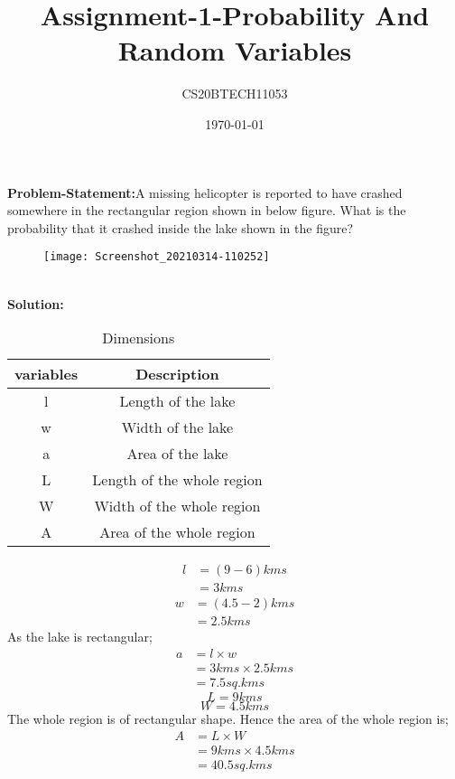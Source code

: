 \documentclass[11pt,a4paper,twocolumn]{article}
\title{Assignment-1-Probability And Random Variables}
\author{CS20BTECH11053 }
\date{\today}
\begin{document}
\maketitle

\textbf{Problem-Statement:}A missing helicopter is reported to have crashed somewhere in the rectangular region shown in below figure. What is the probability that it crashed inside the lake shown in the figure?
\begin{figure}[h]
\centering
 \texttt{[image: Screenshot\_20210314-110252]}
\end{figure}
\\\textbf{Solution:}
\begin{table}[h!]
    \label{Table-1}
    \caption{Dimensions}
    \centering
   
    \begin{tabular}{|c|c|}
    \hline
        variables & Description\\
        \hline
        l&Length of the lake\\
        \hline
        w&Width of the lake\\
        \hline
        a&Area of the lake\\
        \hline
        L&Length of the whole region\\
        \hline
        W&Width of the whole region\\
        \hline
        A&Area of the whole region\\
        \hline
    \end{tabular}
\end{table}
\begin{align}
l &= (9-6)kms\\
  &= 3kms 
\end{align}
\begin{align}
w&=(4.5-2)kms\\
 &=2.5kms
\end{align}
As the lake is rectangular;
\begin{align}
a &={l}\times{w}\\
&={3kms}\times{2.5kms}\\
&=7.5sq.kms
\end{align}
$$L=9kms$$
$$W=4.5kms$$
The whole region is of rectangular shape. Hence the area of the whole region is;
\begin{align}
A &={L}\times{W}\\
&={9kms}\times{4.5kms}\\
&=40.5sq.kms
\end{align}
\end{document}
